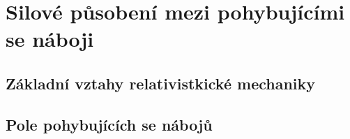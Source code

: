 \graphicspath{{../src/FYZ/img/}}
\setchaptertoc
\chapter{Silové působení mezi pohybujícími se náboji}\label{fyz:IIIchapII}
  \section{Základní vztahy relativistkické mechaniky}\label{fyz:IIIchapIIsecI}
  \section{Pole pohybujících se nábojů}\label{fyz:IIIchapIIsecII}